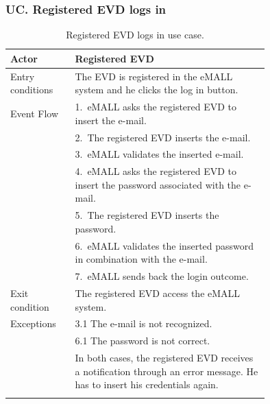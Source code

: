 \subsubsection*{UC\cuc . Registered EVD logs in}
\begin{center}
    \begin{longtable}{lp{0.75\linewidth}}
        \hline
        Actor            & Registered EVD                                                                       \\
        \hline
        Entry conditions & The EVD is registered in the eMALL system and he clicks the log in button.           \\
        \hline
        Event Flow       & 1.\ eMALL asks the registered EVD to insert the e-mail.                              \\
        & 2.\ The registered EVD inserts the e-mail.                                           \\
        & 3.\ eMALL validates the inserted e-mail.                                             \\
        & 4.\ eMALL asks the registered EVD to insert the password associated with the e-mail. \\
        & 5.\ The registered EVD inserts the password.                                         \\
        & 6.\ eMALL validates the inserted password in combination with the e-mail.            \\
        & 7.\ eMALL sends back the login outcome.                                              \\
        \hline
        Exit condition   & The registered EVD access the eMALL system.                                          \\
        \hline
        Exceptions       & 3.1 The e-mail is not recognized.                                                    \\
        & 6.1 The password is not correct.                                                     \\
        & In both cases, the registered EVD receives a notification through an error message.
        He has to insert his credentials again. \\
        \hline
        \caption{Registered EVD logs in use case.}
        \label{tab: EVD_logs_in_use_case}
    \end{longtable}

\end{center}

